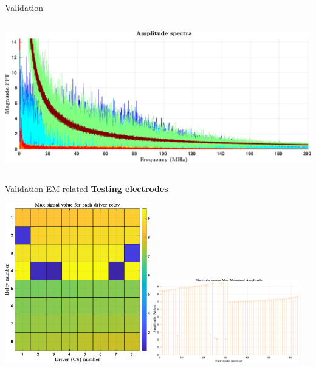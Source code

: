 \documentclass[utf8]{beamer} \usetheme{lfcr} %
\begin{document}
\begin{frame}{Validation}
\begin{columns}
\begin{column}{0.5\textwidth}
      \includegraphics[width=\textwidth]{After_HFnoise_ampspec2.pdf}
    \end{column}
  \end{columns}

\end{frame}
%
\begin{frame}{Validation}
  {EM-related}
  \textbf{Testing electrodes}
  \begin{center}
    \includegraphics[width=0.475\textwidth]{maxperdriverrelay.pdf}
    \includegraphics[width=0.475\textwidth]{ampperelectrode.pdf}
  \end{center}
 
\end{frame}
%
\end{document}
